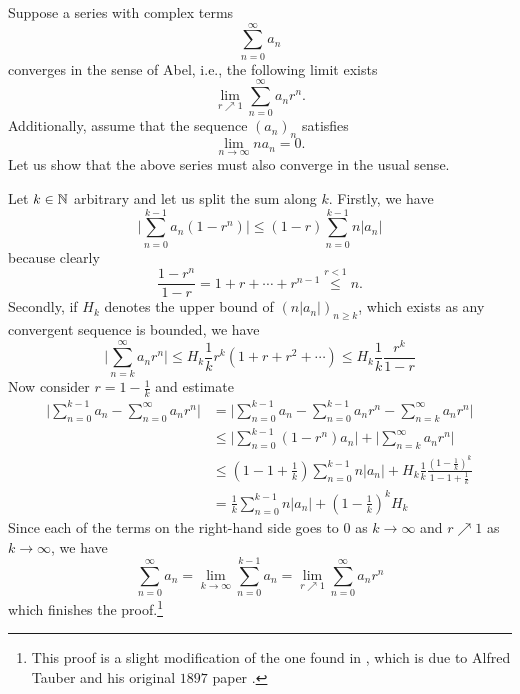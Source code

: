 \documentclass[a4paper, 12pt]{article}
\begin{document}

\begin{Exercise}
    Suppose a series with complex terms
    \[
        \sum_{n = 0}^{\infty} a_n
    \]
    converges in the sense of Abel, i.e., the following limit exists
    \[
        \lim_{r \nearrow 1} \sum_{n = 0}^{\infty} a_n r^n.
    \]
    Additionally, assume that the sequence $(a_n)_n$ satisfies
    \[
        \lim_{n \to \infty} n a_n = 0.
    \]
    Let us show that the above series must also converge in the usual sense.

    Let $k \in \mathbb{N}$ arbitrary and let us split the sum along $k$.  Firstly, we
    have
    \[
        \Big| \sum_{n = 0}^{k-1} a_n (1 - r^n) \Big|
        \leq (1 - r) \sum_{n = 0}^{k-1} n|a_n|
    \]
    because clearly
    \[
        \frac{1 - r^n}{1 - r} = 1 + r + \cdots + r^{n-1} \overset{r < 1}{\leq} n.
    \]
    Secondly, if $H_k$ denotes the upper bound of $(n|a_n|)_{n\geq k}$, which
    exists as any convergent sequence is bounded, we have
    \[
        \Big| \sum_{n = k}^{\infty} a_n r^n \Big|
        \leq H_k \frac{1}{k} r^k (1 + r + r^2 + \cdots)
        \leq H_k \frac{1}{k} \frac{r^k}{1 - r}
    \]
    Now consider $r = 1 - \frac{1}{k}$ and estimate
    \begin{align*}
        \Big| \sum_{n = 0}^{k-1} a_n - \sum_{n = 0}^{\infty} a_n r^n \Big|
        &= \Big| \sum_{n = 0}^{k-1} a_n - \sum_{n = 0}^{k-1} a_n r^n - \sum_{n=k}^{\infty} a_n r^n \Big| \\
        &\leq \Big| \sum_{n = 0}^{k-1} (1 - r^n) a_n \Big| + \Big| \sum_{n=k}^{\infty} a_n r^n \Big| \\
        &\leq (1 - 1 + \frac{1}{k})\sum_{n = 0}^{k-1} n|a_n| + H_k\frac{1}{k} \frac{(1 - \frac{1}{k})^k}{1 - 1 + \frac{1}{k}} \\
        &= \frac{1}{k} \sum_{n = 0}^{k-1} n |a_n| + (1 - \frac{1}{k})^k H_k
    \end{align*}
    Since each of the terms on the right-hand side goes to $0$ as $k \to
    \infty$ and $r \nearrow 1$ as $k \to \infty$, we have
    \[
        \sum_{n = 0}^{\infty} a_n = \lim_{k \to \infty} \sum_{n = 0}^{k-1} a_n = \lim_{r \nearrow 1} \sum_{n = 0}^{\infty} a_n r^n
    \]
    which finishes the proof.\footnote{This proof is a slight modification of
    the one found in \cite[p.\ 251]{Bromwich1908}, which is due to Alfred
    Tauber and his original $1897$ paper \cite{Tauber1897}.}
\end{Exercise}

\end{document}

